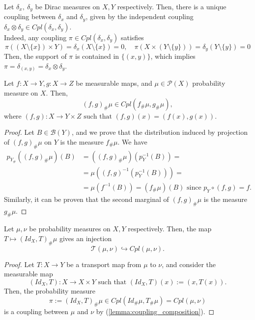 \documentclass[../main.tex]{subfiles}
\begin{document}
\begin{example}
\label{example:dirac_coupling}
    Let $\delta_x, \ \delta_y$ be Dirac measures on $X, Y$ respectively. Then, there is a unique coupling between $\delta_x$ and $\delta_y$, given by the independent coupling $\delta_x \otimes \delta_y\in Cpl(\delta_x, \delta_y)$.\\
    Indeed, any coupling $\pi\in Cpl(\delta_x, \delta_y)$ satisfies 
    $$
    \pi((X\setminus\{x\})\times Y) = \delta_x(X\setminus\{x\}) = 0, 
    \quad
    \pi(X\times (Y\setminus\{y\})) = \delta_y(Y\setminus\{y\}) = 0
    $$
    Then, the support of $\pi$ is contained in $\{(x, y)\}$, which implies $\pi = \delta_{(x, y)} = \delta_x\otimes\delta_y$.
\end{example}

\begin{lemma}
\label{lemma:coupling_composition}
    Let $f:X\to Y, g: X\to Z$ be measurable maps, and $\mu\in\mathcal{P}(X)$ probability measure on $X$. Then,
    $$
    (f, g)_\#\mu \in Cpl(f_\#\mu, g_\#\mu),
    $$
    where $(f,g): X \to Y\times Z \text{ such that } (f,g)(x) = (f(x), g(x))$.
\end{lemma}
\begin{proof}
    Let $B\in\mathcal{B}(Y)$, and we prove that the distribution induced by projection of $(f, g)_\#\mu$ on $Y$ is the measure $f_\#\mu$. We have
    \begin{align*}
        p_{Y_\#}((f, g)_\#\mu)(B) 
        &= ((f, g)_\#\mu)(p^{-1}_Y(B)) = \\
        &= \mu((f,g)^{-1}(p^{-1}_Y(B))) = \\
        &= \mu(f^{-1}(B)) = (f_\#\mu)(B) \text{ since } p_Y \circ (f,g) = f.
    \end{align*}
    Similarly, it can be proven that the second marginal of $(f, g)_\#\mu$ is the measure $g_\#\mu$.
\end{proof}

\begin{proposition}
    Let $\mu, \nu$ be probability measures on $X, Y$ respectively. Then, the map $T\mapsto (Id_X, T)_\#\mu$ gives an injection $$\mathcal{T}(\mu, \nu) \hookrightarrow Cpl(\mu, \nu).$$
\end{proposition}
\begin{proof}
    Let $T: X\to Y$ be a transport map from $\mu$ to $\nu$, and consider the measurable map $$(Id_X, T) : X \to X\times Y \text{ such that } (Id_X, T)(x) := (x, T(x)).$$
    Then, the probability measure $$\pi := (Id_X, T)_\#\mu \in Cpl(Id_\#\mu, T_\#\mu) = Cpl(\mu, \nu)$$ is a coupling between $\mu$ and $\nu$ by (\ref{lemma:coupling_composition}).
\end{proof}
\end{document}
